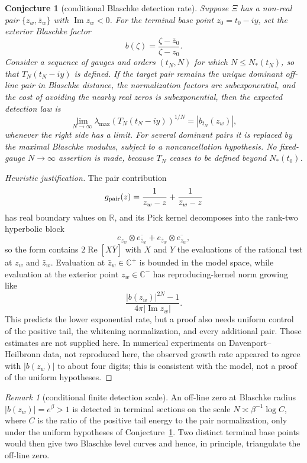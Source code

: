 \documentclass[11pt]{amsart}
\newtheorem{conjecture}[theorem]{Conjecture}
\theoremstyle{definition}
\theoremstyle{remark}
\newtheorem{remark}[theorem]{Remark}
\theoremstyle{definition}
\renewcommand{\Re}{\operatorname{Re}}
\renewcommand{\Im}{\operatorname{Im}}
\newcommand{\R}{\mathbb{R}}
\newcommand{\C}{\mathbb{C}}
\begin{document}
\begin{conjecture}[conditional Blaschke detection rate]\label{prop:blaschke-rate}
Suppose $\Xi$ has a non-real pair $\{z_w,\bar z_w\}$ with $\Im z_w<0$.  For the terminal base point
$z_0=t_0-iy$, set the exterior Blaschke factor
\[
   b(\zeta)=\frac{\zeta-\bar z_0}{\zeta-z_0}.
\]
Consider a sequence of gauges and orders $(t_N,N)$ for which $N\le N_*(t_N)$, so that $T_N(t_N-iy)$
is defined.  If the target pair remains the unique dominant off-line pair in Blaschke distance, the
normalization factors are subexponential, and the cost of avoiding the nearby real zeros is
subexponential, then the expected detection law is
\[
   \lim_{N\to\infty}\lambda_{\max}(T_N(t_N-iy))^{1/N}=|b_{t_N}(z_w)|,
\]
whenever the right side has a limit.  For several dominant pairs it is replaced by the maximal
Blaschke modulus, subject to a noncancellation hypothesis.  No fixed-gauge $N\to\infty$ assertion is
made, because $T_N$ ceases to be defined beyond $N_*(t_0)$.
\end{conjecture}

\begin{proof}[Heuristic justification]
The pair contribution
\[
   g_{\rm pair}(z)=\frac1{z_w-z}+\frac1{\bar z_w-z}
\]
has real boundary values on $\R$, and its Pick kernel decomposes into the rank-two hyperbolic block
\[
   e_{z_w}\otimes\overline{e_{\bar z_w}}
   +
   e_{\bar z_w}\otimes\overline{e_{z_w}},
\]
so the form contains $2\Re[X\overline Y]$ with $X$ and $Y$ the evaluations of the rational test at
$z_w$ and $\bar z_w$.  Evaluation at $\bar z_w\in\C^+$ is bounded in the model space, while evaluation
at the exterior point $z_w\in\C^-$ has reproducing-kernel norm growing like
\[
   \frac{|b(z_w)|^{2N}-1}{4\pi|\Im z_w|}.
\]
This predicts the lower exponential rate, but a proof also needs uniform control of the positive tail,
the whitening normalization, and every additional pair.  Those estimates are not supplied here.  In
numerical experiments on Davenport--Heilbronn data, not reproduced here, the observed growth rate
appeared to agree with $|b(z_w)|$ to about four digits; this is consistent with the model, not a proof
of the uniform hypotheses.
\end{proof}

\begin{remark}[conditional finite detection scale]\label{cor:blaschke-detection}
An off-line zero at Blaschke radius $|b(z_w)|=e^\beta>1$ is detected in terminal sections on the scale
$N\asymp \beta^{-1}\log C$, where $C$ is the ratio of the positive tail energy to the pair
normalization, only under the uniform hypotheses of
Conjecture~\ref{prop:blaschke-rate}.  Two distinct terminal base points would then give two Blaschke
level curves and hence, in principle, triangulate the off-line zero.
\end{remark}
\end{document}
